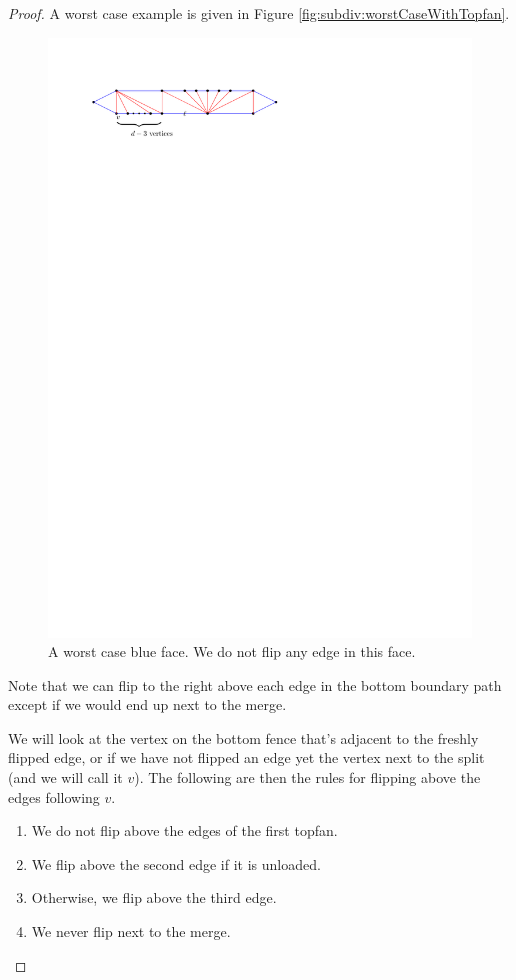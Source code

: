   \begin{proof}
  A worst case example is given in Figure \ref{fig:subdiv:worstCaseWithTopfan}.

  \begin{figure}[h]
    \centering
    \includegraphics[scale=1]{blueFaceSubdivision/img/worstCaseWithTopFan}
    \caption{A worst case blue face. We do not flip any edge in this face.}
    \label{fig:subdiv:worstCaseWithTopFan}
  \end{figure}

  Note that we can flip to the right above each edge in the bottom boundary path except if we would end up next to the merge.

  We will look at the vertex on the bottom fence that's adjacent to the freshly flipped edge, or if we have not flipped an edge yet the vertex next to the split (and we will call it $v$). The following are then the rules for flipping above the edges following $v$.
  \begin{enumerate}
    \item We do not flip above the edges of the first topfan.
    \item We flip above the second edge if it is unloaded.
    \item Otherwise, we flip above the third edge.
    \item We never flip next to the merge.
  \end{enumerate}


\end{proof}
